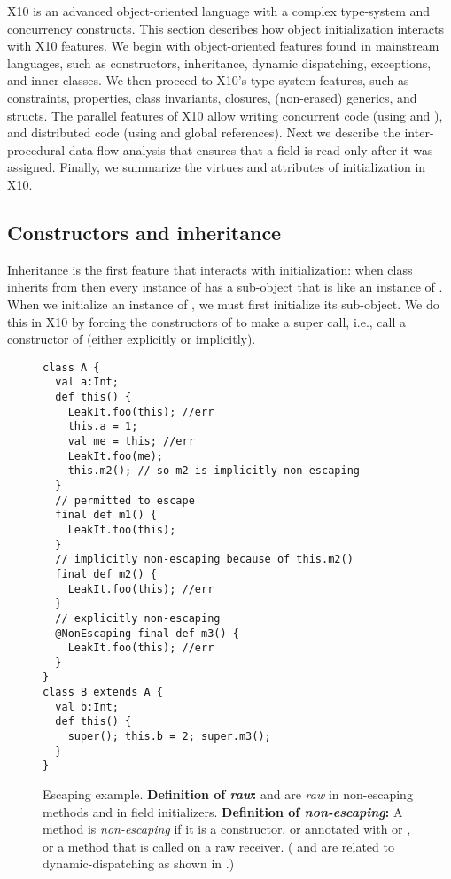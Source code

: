 X10 is an advanced object-oriented language with a complex type-system
    and concurrency constructs.
This section describes how object initialization interacts with X10 features.
We begin with object-oriented features found in mainstream languages,
    such as constructors, inheritance, dynamic dispatching, exceptions, and inner classes.
We then proceed to X10's type-system features,
    such as constraints, properties, class invariants, closures, (non-erased) generics, and structs.
The parallel features of X10 allow writing concurrent code (using  and ),
    and distributed code (using  and global references).
Next we describe the inter-procedural data-flow analysis that ensures that
    a field is read only after it was assigned.
Finally, we summarize the virtues and attributes of initialization in X10.


\subsection{Constructors and inheritance}
Inheritance is the first feature that interacts with initialization:
    when class  inherits from 
    then every instance of  has a sub-object that is like an instance of .
When we initialize an instance of , we must first initialize its  sub-object.
We do this in X10 by forcing the constructors of  to make a super call,
    i.e., call a constructor of 
    (either explicitly or implicitly).



\begin{figure}
\begin{lstlisting}
class A {
  val a:Int;
  def this() {
    LeakIt.foo(this); //err
    this.a = 1;
    val me = this; //err
    LeakIt.foo(me);
    this.m2(); // so m2 is implicitly non-escaping
  }
  // permitted to escape
  final def m1() {
    LeakIt.foo(this);
  }
  // implicitly non-escaping because of this.m2()
  final def m2() {
    LeakIt.foo(this); //err
  }
  // explicitly non-escaping
  @NonEscaping final def m3() {
    LeakIt.foo(this); //err
  }
}
class B extends A {
  val b:Int;
  def this() {
    super(); this.b = 2; super.m3();
  }
}
\end{lstlisting}
\caption{Escaping \this example.
    \textbf{Definition of \emph{raw}:}
    {\this and  are \emph{raw} in {non-escaping} methods and in field initializers}.
    \textbf{Definition of \emph{non-escaping}:}
        {A method is \emph{non-escaping} if it is a constructor,
            or annotated with  or ,
            or a method that is called on a raw \this receiver}.
    ( and  are related
        to dynamic-dispatching as shown in .)}
\label{Figure:Escaping-this}
\end{figure}

